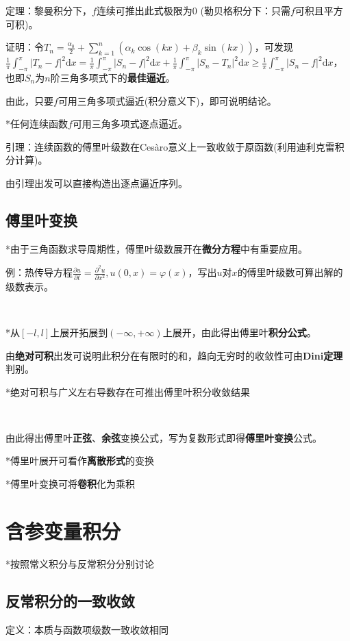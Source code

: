 \documentclass[a4paper,UTF8]{ctexart}
\begin{document}
定理：黎曼积分下，$f$连续可推出此式极限为0 (勒贝格积分下：只需$f$可积且平方可积)。

证明：令$T_n=\frac{\alpha_0}{2}+\sum_{k=1}^n(\alpha_k\cos(kx)+\beta_k\sin(kx))$，可发现$\frac{1}{\pi}\int_{-\pi}^\pi|T_n-f|^2\mathrm{d}x=\frac{1}{\pi}\int_{-\pi}^\pi|S_n-f|^2\mathrm{d}x+\frac{1}{\pi}\int_{-\pi}^\pi|S_n-T_n|^2\mathrm{d}x\ge\frac{1}{\pi}\int_{-\pi}^\pi|S_n-f|^2\mathrm{d}x$，也即$S_n$为$n$阶三角多项式下的\textbf{最佳逼近}。

由此，只要$f$可用三角多项式逼近(积分意义下)，即可说明结论。

*任何连续函数$f$可用三角多项式逐点逼近。

引理：连续函数的傅里叶级数在Ces\`aro意义上一致收敛于原函数(利用迪利克雷积分计算)。

由引理出发可以直接构造出逐点逼近序列。

\subsection{傅里叶变换}
*由于三角函数求导周期性，傅里叶级数展开在\textbf{微分方程}中有重要应用。

例：热传导方程$\frac{\partial u}{\partial t}=\frac{\partial^2u}{\partial x^2},u(0,x)=\varphi(x)$，写出$u$对$x$的傅里叶级数可算出解的级数表示。

~

*从$[-l,l]$上展开拓展到$(-\infty,+\infty)$上展开，由此得出傅里叶\textbf{积分公式}。

由\textbf{绝对可积}出发可说明此积分在有限时的和，趋向无穷时的收敛性可由\textbf{Dini定理}判别。

*绝对可积与广义左右导数存在可推出傅里叶积分收敛结果

~

由此得出傅里叶\textbf{正弦}、\textbf{余弦}变换公式，写为复数形式即得\textbf{傅里叶变换}公式。

*傅里叶展开可看作\textbf{离散形式}的变换

*傅里叶变换可将\textbf{卷积}化为乘积

\section{含参变量积分}
*按照常义积分与反常积分分别讨论

\subsection{反常积分的一致收敛}
定义：本质与函数项级数一致收敛相同
\end{document}
